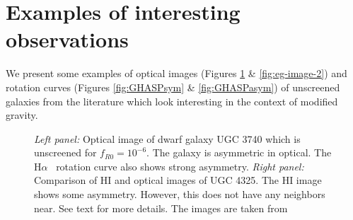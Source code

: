 \documentclass[useAMS,usenatbib,twocolumn]{mn2e}
\newcommand{\ha}{H$\alpha$}
\begin{document}
\section{Examples of interesting observations}
\label{ap:curves}
We present some examples of optical images (Figures \ref{fig:eg-image-1} \&
\ref{fig:eg-image-2}) and rotation curves (Figures \ref{fig:GHASPsym} \&
\ref{fig:GHASPasym}) of unscreened galaxies from the literature which look
interesting in the context of modified gravity. 


\begin{figure}
\caption{{\it Left panel:} Optical image of dwarf galaxy UGC 3740 which is
unscreened for $f_{R0}=10^{-6}$. The galaxy is asymmetric in optical. The \ha~
rotation curve also shows strong asymmetry. 
{\it Right panel:} Comparison of HI and optical images of UGC 4325. The HI
image shows some asymmetry. However, this does not have any neighbors near. See
text for more details. The images are taken from \citet{figgs2008,swaters2002b}
\label{fig:eg-image-1}}
\end{figure}
\end{document}
